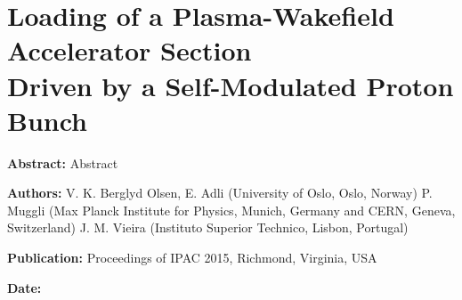 %
%

\chapter{Loading of a Plasma-Wakefield Accelerator Section\\Driven by a Self-Modulated Proton Bunch}
\label{Pub:IPAC15}

\begin{hangparas}{10mm}{1}

    \textbf{Abstract:}
    Abstract

    \vspace{8mm}

    \textbf{Authors:}
    V. K. Berglyd Olsen, E. Adli (University of Oslo, Oslo, Norway)
    P. Muggli (Max Planck Institute for Physics, Munich, Germany and CERN, Geneva, Switzerland)
    J. M. Vieira (Instituto Superior Technico, Lisbon, Portugal)


    \vspace{5mm}

    \textbf{Publication:}
    Proceedings of IPAC 2015, Richmond, Virginia, USA

    \vspace{5mm}

    \textbf{Date:}

\end{hangparas}
